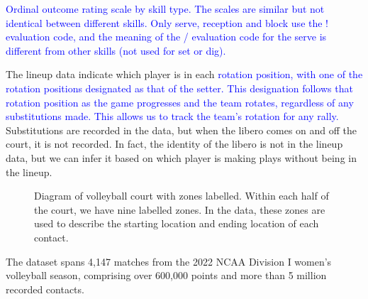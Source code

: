 \documentclass[USenglish]{article}
\theoremstyle{dgthm}
\theoremstyle{dgdef}
\begin{document}
\begin{table}
    \centering
    
    \caption{\textcolor{blue}{Ordinal outcome rating scale by skill type. The scales are similar but not identical between different skills. Only serve, reception and block use the ! evaluation code, and the meaning of the / evaluation code for the serve is different from other skills (not used for set or dig).}}
    \label{tab:evaluation-codes}
\end{table}

The lineup data indicate which player is in each \textcolor{blue}{rotation position, with one of the rotation positions designated as that of the setter. This designation follows that rotation position as the game progresses and the team rotates, regardless of any substitutions made. This allows us to track the team's rotation for any rally.} Substitutions are recorded in the data, but when the libero comes on and off the court, it is not recorded. In fact, the identity of the libero is not in the lineup data, but we can infer it based on which player is making plays without being in the lineup.

\begin{figure}
    \centering
    \caption{Diagram of volleyball court with zones labelled. Within each half of the court, we have nine labelled zones. In the data, these zones are used to describe the starting location and ending location of each contact.}
    \label{fig:volleyball-court-diagram}
\end{figure}

The dataset spans 4,147 matches from the 2022 NCAA Division I women's volleyball season, comprising over 600,000 points and more than 5 million recorded contacts.
\end{document}
